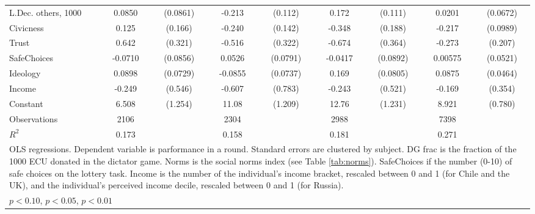 {\begin{tabular}{l*{4}{cc}}
L.Dec. others, 1000&   0.0850         & (0.0861)&   -0.213\sym{*}  &  (0.112)&    0.172         &  (0.111)&   0.0201         & (0.0672)\\
Civicness       &    0.125         &  (0.166)&   -0.240\sym{*}  &  (0.142)&   -0.348\sym{*}  &  (0.188)&   -0.217\sym{**} & (0.0989)\\
Trust           &    0.642\sym{**} &  (0.321)&   -0.516         &  (0.322)&   -0.674\sym{*}  &  (0.364)&   -0.273         &  (0.207)\\
SafeChoices     &  -0.0710         & (0.0856)&   0.0526         & (0.0791)&  -0.0417         & (0.0892)&  0.00575         & (0.0521)\\
Ideology        &   0.0898         & (0.0729)&  -0.0855         & (0.0737)&    0.169\sym{**} & (0.0805)&   0.0875\sym{*}  & (0.0464)\\
Income          &   -0.249         &  (0.546)&   -0.607         &  (0.783)&   -0.243         &  (0.521)&   -0.169         &  (0.354)\\
Constant        &    6.508\sym{***}&  (1.254)&    11.08\sym{***}&  (1.209)&    12.76\sym{***}&  (1.231)&    8.921\sym{***}&  (0.780)\\
\hline
Observations    &     2106         &         &     2304         &         &     2988         &         &     7398         &         \\
\(R^{2}\)       &    0.173         &         &    0.158         &         &    0.181         &         &    0.271         &         \\
\hline\hline
\multicolumn{9}{l}{\footnotesize OLS regressions. Dependent variable is parformance in a round. Standard errors are clustered by subject. DG frac is the fraction of the 1000 ECU donated in the dictator game. Norms is the social norms index (see Table \ref{tab:norms}). SafeChoices if the number (0-10) of safe choices on the lottery task. Income is the number of the individual's income bracket, rescaled between 0 and 1 (for Chile and the UK), and the individual's perceived income decile, rescaled between 0 and 1 (for Russia).}\\
\multicolumn{9}{l}{\footnotesize \sym{*} \(p<0.10\), \sym{**} \(p<0.05\), \sym{***} \(p<0.01\)}\\
\end{tabular}
}
